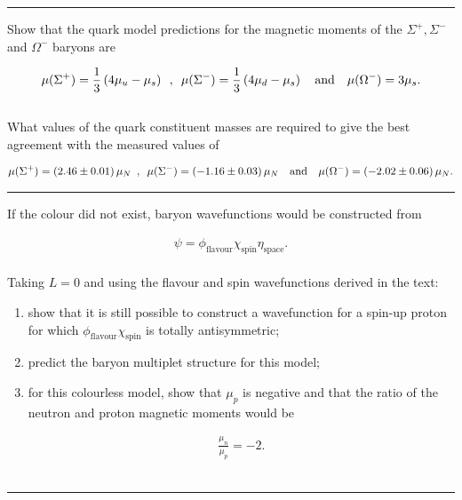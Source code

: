 \noindent\rule{7in}{1.5pt}


\begin{problem}{9.9}
Show that the quark model predictions for the magnetic moments of the $\Sigma^+,\Sigma^-$ and $\Omega^-$ baryons are

\begin{align*}
    \mu(\Sigma^+) = \frac{1}{3} \left( 4\mu_u - \mu_s \right) \hskip0.5em\relax , \hskip0.5em\relax \mu(\Sigma^-) = \frac{1}{3} \left( 4\mu_d - \mu_s \right) \quad \text{and} \quad \mu(\Omega^-) = 3\mu_s .
\end{align*}\\
What values of the quark constituent masses are required to give the best agreement with the measured values of

\begin{align*}
    \mu(\Sigma^+) = \left( 2.46 \pm 0.01 \right) \mu_N  \hskip0.5em\relax , \hskip0.5em\relax \mu(\Sigma^-) = \left( -1.16 \pm 0.03 \right) \mu_N \quad \text{and} \quad \mu(\Omega^-) = \left( -2.02 \pm 0.06 \right)  \mu_N .
\end{align*}
\end{problem}
\begin{solution}

\end{solution}

\noindent\rule{7in}{1.5pt}


\begin{problem}{9.10}
If the colour did not exist, baryon wavefunctions would be constructed from

\begin{align*}
    \psi = \phi_\text{flavour} \chi_\text{spin} \eta_\text{space} .
\end{align*}\\
Taking $L = 0$ and using the flavour and spin wavefunctions derived in the text:

\begin{enumerate}[label=(\alph*)]
    \item show that it is still possible to construct a wavefunction for a spin-up proton for which $\phi_\text{flavour} \chi_\text{spin}$ is totally antisymmetric;
    \item predict the baryon multiplet structure for this model;
    \item for this colourless model, show that $\mu_p$ is negative and that the ratio of the neutron and proton magnetic moments would be
    
    \begin{align*}
        \frac{\mu_n}{\mu_p} = -2 .
    \end{align*}\\
\end{enumerate}
\end{problem}
\begin{solution}

\end{solution}

\noindent\rule{7in}{1.5pt}

